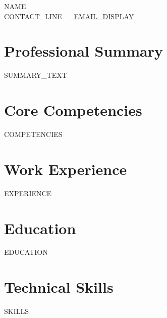 \documentclass[letterpaper,11pt]{article}
\makeatletter
\newcommand{\resumeItem}[1]{
  \item\small{
    {#1 \vspace{-3pt}}
  }
}
\newcommand{\resumeSubheading}[4]{
  \vspace{-3pt}\item
    \begin{tabular*}{1.0\textwidth}[t]{p{0.75\textwidth}@{\extracolsep{\fill}}r}
      \textbf{#1} & \textbf{\small #2} \\
      \textit{\small#3} & \textit{\small #4} \\
    \end{tabular*}\vspace{-7pt}
}
\newcommand{\resumeSubHeadingListStart}{\begin{itemize}[leftmargin=0.0in, label={}]}
\newcommand{\resumeSubHeadingListEnd}{\end{itemize}}
\newcommand{\resumeItemListStart}{\begin{itemize}\raggedright}
\newcommand{\resumeItemListEnd}{\end{itemize}\vspace{0pt}}
\makeatother
\begin{document}
    \begin{center}
        {\Huge\scshape {{NAME}}}
        \\ \small {{CONTACT_LINE}} ~
        \href{{{EMAIL_URL}}}{\raisebox{-0.2\height}\faEnvelope\  \underline{{{EMAIL_DISPLAY}}}}
    \end{center}

\section{Professional Summary}
{\small {{SUMMARY_TEXT}}}

\section{Core Competencies}
{\small {{COMPETENCIES}}}

\section{Work Experience}
  \resumeSubHeadingListStart
{{EXPERIENCE}}
  \resumeSubHeadingListEnd

\section{Education}
  \resumeSubHeadingListStart
{{EDUCATION}}
  \resumeSubHeadingListEnd

\section{Technical Skills}
\vspace{-7pt}
\begin{itemize}
[leftmargin=0.15in, label={}]\small{\item{
{{SKILLS}}
}}
\end{itemize}
\end{document}
